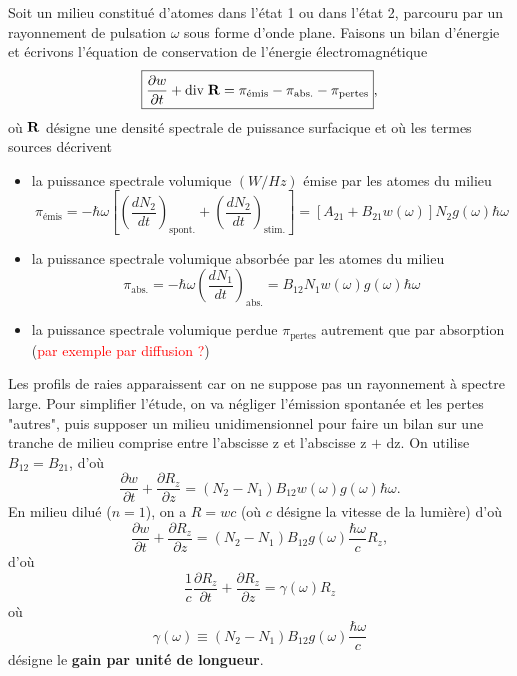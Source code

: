 \documentclass[11pt,a4paper]{report}
\begin{document}
Soit un milieu constitué d'atomes dans l'état 1 ou dans l'état 2, parcouru par un rayonnement de pulsation $\omega$ sous forme d'onde plane. Faisons un bilan d'énergie et écrivons l'équation de conservation de l'énergie électromagnétique 
\begin{equation}
	\boxed{\frac{\partial w}{\partial t} + \text{div}\;\bold{R} 
	= \pi_\text{émis} - \pi_\text{abs.} - \pi_\text{pertes}},
\end{equation}
où $\bold{R}$ désigne une densité spectrale de puissance surfacique et où les termes sources décrivent 
\begin{itemize}
	\item la puissance spectrale volumique $(W/Hz)$ émise par les atomes du milieu
		\begin{equation}
			\pi_\text{émis} = -\hbar\omega \left[ \left(\frac{dN_2}{dt}\right)_\text{spont.}   
			+  \left(\frac{dN_2}{dt}\right)_\text{stim.} \right]
			= \left[A_{21} + B_{21}w(\omega)\right]N_2 g(\omega) \hbar\omega
		\end{equation}
	\item la puissance spectrale volumique absorbée par les atomes du milieu
		\begin{equation}
			\pi_\text{abs.} = -\hbar\omega \left(\frac{dN_1}{dt}\right)_\text{abs.}   
			= B_{12} N_1 w(\omega) g(\omega)\hbar\omega
		\end{equation}
	\item la puissance spectrale volumique perdue $\pi_\text{pertes}$ autrement que par absorption 				(\textcolor{red}{par exemple par diffusion ?})
\end{itemize}
Les profils de raies apparaissent car on ne suppose pas un rayonnement à spectre large. Pour simplifier l'étude, on va négliger l'émission spontanée et les pertes "autres", puis supposer un milieu unidimensionnel pour faire un bilan sur une tranche de milieu comprise entre l'abscisse z et l'abscisse z $+$ dz. On utilise $B_{12} = B_{21}$, d'où
\begin{equation}
	\frac{\partial w}{\partial t} + \frac{\partial R_z}{\partial z}
	= \left(N_2 - N_1\right)B_{12}w(\omega)g(\omega)\hbar\omega.
\end{equation}
En milieu dilué ($n = 1$), on a $R = wc$ (où $c$ désigne la vitesse de la lumière) d'où
\begin{equation}
	\frac{\partial w}{\partial t} + \frac{\partial R_z}{\partial z}
	= \left(N_2 - N_1\right)B_{12}g(\omega)\frac{\hbar\omega}{c}R_z,
\end{equation}
d'où
\begin{equation}
	\boxed{\frac{1}{c}\frac{\partial R_z}{\partial t} + \frac{\partial R_z}{\partial z} 
	= \gamma(\omega)R_z}
\end{equation}
où
\begin{equation}
	\boxed{\gamma(\omega) \equiv \left(N_2 - N_1\right)B_{12}g(\omega)\frac{\hbar\omega}{c}}
\end{equation}
désigne le \textbf{gain par unité de longueur}.\\
\end{document}
